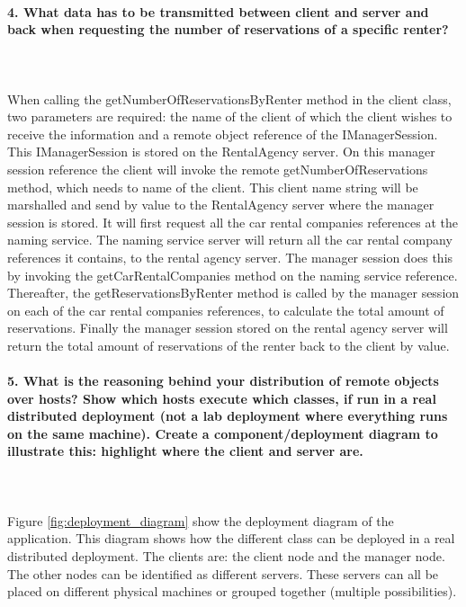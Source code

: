 \documentclass{ds-report}
\begin{document}
	\paragraph{4. What data has to be transmitted between client and server and back when requesting the number of reservations of a specific renter?} \mbox{}\\\\
When calling the getNumberOfReservationsByRenter method in the client class, two parameters are required: the name of the client of which the client wishes to receive the information and a remote object reference of the IManagerSession. This IManagerSession is stored on the RentalAgency server. On this manager session reference the client will invoke the remote getNumberOfReservations method, which needs to name of the client. This client name string will be marshalled and send by value to the RentalAgency server where the manager session is stored. It will first request all the car rental companies references at the naming service. The naming service server will return all the car rental company references it contains, to the rental agency server. The manager session does this by invoking the getCarRentalCompanies method on the naming service reference.
Thereafter, the getReservationsByRenter method is called by the manager session on each of the car rental companies references, to calculate the total amount of reservations. Finally the manager session stored on the rental agency server will return the total amount of reservations of the renter back to the client by value.   

\clearpage
	\paragraph{5. What is the reasoning behind your distribution of remote objects over hosts? Show which hosts execute which classes, if run in a real distributed deployment (not a lab deployment where everything runs on the same machine). Create a component/deployment diagram to illustrate this: highlight where the client and server are.} \mbox{}\\\\
Figure \ref{fig:deployment_diagram} show the deployment diagram of the application. This diagram shows how the different class can be deployed in a real distributed deployment. The clients are: the client node and the manager node. The other nodes can be identified as different servers. These servers can all be placed on different physical machines or grouped together (multiple possibilities).
\end{document}

